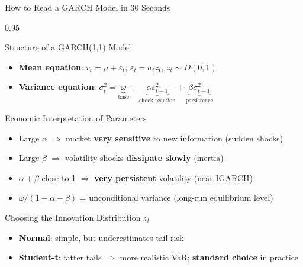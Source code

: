 \documentclass[9pt, aspectratio=169, t]{beamer}
\begin{document}
\begin{frame}{How to Read a GARCH Model in 30 Seconds}
    \begin{cminipage}{0.95\textwidth}
        \vspace{-0.2cm}
        \footnotesize
        \begin{block}{Structure of a GARCH(1,1) Model}
            \begin{itemize}\setlength{\itemsep}{0pt}
                \item \textbf{Mean equation}: $r_t = \mu + \varepsilon_t$, \quad $\varepsilon_t = \sigma_t z_t$, \quad $z_t \sim D(0,1)$
                \item \textbf{Variance equation}: $\sigma_t^2 = \underbrace{\omega}_{\text{base}} + \underbrace{\alpha \varepsilon_{t-1}^2}_{\text{shock reaction}} + \underbrace{\beta \sigma_{t-1}^2}_{\text{persistence}}$
            \end{itemize}
        \end{block}
        \vspace{-1.5mm}
        \begin{exampleblock}{Economic Interpretation of Parameters}
            \begin{itemize}\setlength{\itemsep}{0pt}
                \item Large $\alpha$ $\Rightarrow$ market \textbf{very sensitive} to new information (sudden shocks)
                \item Large $\beta$ $\Rightarrow$ volatility shocks \textbf{dissipate slowly} (inertia)
                \item $\alpha + \beta$ close to 1 $\Rightarrow$ \textbf{very persistent} volatility (near-IGARCH)
                \item $\omega / (1 - \alpha - \beta)$ = unconditional variance (long-run equilibrium level)
            \end{itemize}
        \end{exampleblock}
        \vspace{-1.5mm}
        \begin{alertblock}{Choosing the Innovation Distribution $z_t$}
            \begin{itemize}\setlength{\itemsep}{0pt}
                \item \textbf{Normal}: simple, but underestimates tail risk
                \item \textbf{Student-t}: fatter tails $\Rightarrow$ more realistic VaR; \textbf{standard choice} in practice
            \end{itemize}
        \end{alertblock}
    \end{cminipage}
\end{frame}
\end{document}
